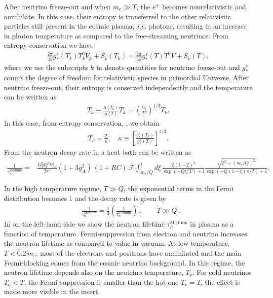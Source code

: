 After neutrino freeze-out and when $m_e\gg T$, the $e^{\pm}$ becomes nonrelativistic and annihilate. In this case, their entropy is transferred to the other relativistic particles still present in the cosmic plasma, {\it i.e.\/} photons, resulting in an increase in photon temperature as compared to the free-streaming neutrinos. From entropy conservation we have
\begin{align}
\label{Entropy}
\frac{2\pi}{45}g^s_\ast(T_k)T^3_kV_k+S_{\nu}(T_k)=\frac{2\pi}{45}g^s_\ast(T)T^3V+S_{\nu}(T),
\end{align}
where we use the subscripts $k$ to denote quantities for neutrino freeze-out and $g^s_\ast$ counts the degree of freedom for relativistic species in primordial Universe. After neutrino freeze-out, their entropy is conserved independently and the temperature can be written as
\begin{align}
T_\nu\equiv\frac{a(t_k)}{a(t)}T_k=\left(\frac{V_k}{V}\right)^{1/3}T_k.
\end{align}
In this case, from entropy conservation, , we obtain
\begin{align}
\label{Neutrino_Photon}
T_\nu=\frac{T}{\kappa},\,\,\,\,\,\,\kappa\equiv\left[\frac{g^s_\ast(T_k)}{g^s_\ast(T)}\right]^{1/3}.
\end{align}
From  the neutron decay rate in a heat bath can be written as
\begin{align}
\label{Decay:Rate_03}
\frac{1}{\tau_n^\mathrm{Medium}}=&\frac{G^2_FQ^5V^2_{ud}}{2\pi^3}(1+3g^2_A)\,(1+RC)\,\mathcal{F}
\int^1_{m_e/Q}d\xi\,\frac{\xi(1-\xi)^2}{\exp\left(-Q\xi/{T}\right)+1}\frac{\sqrt{\xi^2-(m_e/Q)^2}}{\exp\left(-Q(1-\xi)\kappa/T\right)+1}. 
\end{align}

In the high temperature regime, $T\gg Q$, the exponential terms in the Fermi distribution becomes $1$ and the decay rate is given by
\begin{align}
&\frac{1}{\tau_n^\mathrm{Medium}}=\frac{1}{4}\left(\frac{1}{\tau_n^\mathrm{Vacuum}}\right)\;,
\qquad
T\gg Q\;.
\end{align}
In  on the left-hand side we show the  neutron lifetime $\tau^\mathrm{Medium}_n$ in plasma as a function of temperature. Fermi-suppression from electron and neutrino increases the neutron lifetime as compared to value in vacuum. At low temperature, $T<0.2\,m_e$, most of the electrons and positrons have annihilated and the main Fermi-blocking comes from the cosmic neutrino background. In this regime, the neutron lifetime depends also on the neutrino temperature, $T_\nu$. For cold neutrinos $T_\nu<T$, the Fermi suppression is smaller than the hot one $T_\nu=T$, the effect is made more visible in the insert.

